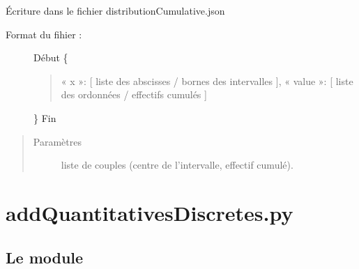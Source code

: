 \documentclass[letterpaper,10pt,french]{sphinxmanual}
\begin{document}

\begin{fulllineitems}
\label{\detokenize{addQuantitativesContinues:add.addQuantitativesContinues.infoDistributionCumulativeContinue}}
Écriture dans le fichier distributionCumulative.json
\begin{description}
\item[{Format du fihier :}] \leavevmode
Début
\{
\begin{quote}

« x »: {[} liste des abscisses / bornes des intervalles {]},
« value »: {[} liste des ordonnées / effectifs cumulés {]}
\end{quote}

\}
Fin

\end{description}
\begin{quote}\begin{description}
\item[{Paramètres}] \leavevmode
{} \textendash{} liste de couples (centre de l’intervalle, effectif cumulé).

\end{description}\end{quote}

\end{fulllineitems}



\chapter{addQuantitativesDiscretes.py}
\label{\detokenize{addQuantitativesDiscretes:addquantitativesdiscretes-py}}\label{\detokenize{addQuantitativesDiscretes:module-add.addQuantitativesDiscretes}}\label{\detokenize{addQuantitativesDiscretes::doc}}

\section{Le module }
\label{\detokenize{addQuantitativesDiscretes:le-module-analyse-de-donnees-quantitatives-discretes}}
\end{document}
